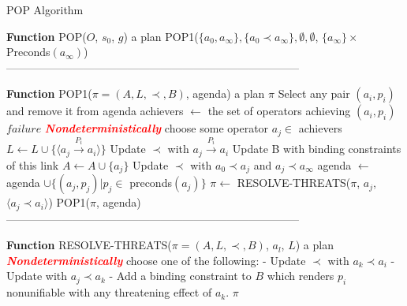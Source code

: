 \begin{algorithm}
    \caption{POP Algorithm}
    \label{alg:pop}
    \begin{algorithmic}[1]
        \STATE \textbf{Function} POP($O$, $s_0$, $g$)
        \ENSURE a plan
        \RETURN POP1($\{a_0, a_{\infty}\}, \{a_0 \prec a_{\infty}\}, \emptyset, \emptyset$, $\{a_{\infty}\} \times$ Preconds$(a_{\infty})$)\\

        \STATE --------------------------------------------------------------------------------
        \STATE

        \STATE \textbf{Function} POP1($\pi = (A, L, \prec, B)$, agenda)
        \ENSURE a plan
        \RETURN $\pi$
        \ENDIF
        \STATE Select any pair $(a_i, p_i)$ and remove it from agenda
        \STATE achievers $\leftarrow$ the set of operators achieving $(a_i, p_i)$
        \RETURN $failure$
        \ENDIF
        \STATE \textcolor{red}{\textbf{\textit{Nondeterministically}}} choose some operator $a_j \in$ achievers
        \STATE $L \leftarrow L \cup \{\langle a_j \xrightarrow{\text{$P_i$}} a_i\rangle\}$
        \STATE Update $\prec$ with $a_j \xrightarrow{\text{$P_i$}} a_i$
        \STATE Update B with binding constraints of this link
        \STATE $A \leftarrow A \cup \{a_j\}$
        \STATE Update $\prec$ with $a_0 \prec a_j$ and $a_j \prec a_{\infty}$
        \STATE agenda $\leftarrow$ agenda $\cup \{(a_j, p_j)|p_j \in$ preconds$(a_j)\}$
        \ENDIF
        \STATE $\pi \leftarrow$ RESOLVE-THREATS($\pi$, $a_j$, $\langle a_j \prec a_i\rangle$)
        \RETURN POP1($\pi$, agenda)\\

        \STATE --------------------------------------------------------------------------------
        \STATE

        \STATE \textbf{Function} RESOLVE-THREATS($\pi = (A, L, \prec, B)$, $a_l$, $L$)
        \ENSURE a plan
        \STATE \textcolor{red}{\textbf{\textit{Nondeterministically}}} choose one of the following:
        \STATE - Update $\prec$ with $a_k \prec a_i$
        \STATE - Update with $a_j \prec a_k$
        \STATE - Add a binding constraint to $B$ which renders $p_i$ nonunifiable with any threatening effect of $a_k$.
        \ENDFOR
        \RETURN $\pi$
    \end{algorithmic}
\end{algorithm}

